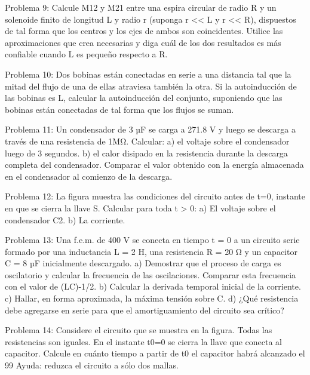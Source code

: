 Problema 9:
Calcule M12 y M21 entre una espira circular de radio R y un solenoide finito de longitud L y radio r (suponga r << L y r << R), dispuestos de tal forma que los centros y los ejes de ambos son coincidentes. Utilice las aproximaciones que crea necesarias y diga cuál de los dos resultados es más confiable cuando L es pequeño respecto a R.

Problema 10:
Dos bobinas están conectadas en serie a una distancia tal que la mitad del flujo de una de ellas atraviesa también la otra. Si la autoinducción de las bobinas es L, calcular la autoinducción del conjunto, suponiendo que las bobinas están conectadas de tal forma que los flujos se suman.



Problema 11:
Un condensador de 3 µF se carga a 271.8 V y luego se descarga a través de una resistencia de 1MΩ. Calcular:
a)	el voltaje sobre el condensador luego de 3 segundos.
b)	el calor disipado en la resistencia durante la descarga completa del condensador. Comparar el valor obtenido con la energía almacenada en el condensador al comienzo de la descarga.



Problema 12:
La figura muestra las condiciones del circuito antes de t=0, instante en que se cierra la llave S. Calcular para toda t > 0:
a)	El voltaje sobre el condensador C2.
b)	La corriente.



Problema 13:
Una f.e.m. de 400 V se conecta en tiempo t = 0 a un circuito serie formado por una inductancia
L = 2 H, una resistencia R = 20 Ω y un capacitor C = 8 µF inicialmente descargado.
a)	Demostrar que el proceso de carga es oscilatorio y calcular la frecuencia de las oscilaciones.
Comparar esta frecuencia con el valor de (LC)-1/2.
b)	Calcular la derivada temporal inicial de la corriente.
c)	Hallar, en forma aproximada, la máxima tensión sobre C.
d)	¿Qué resistencia debe agregarse en serie para que el amortiguamiento del circuito sea crítico?
 


 
Problema 14:
Considere el circuito que se muestra en la figura. Todas las resistencias son iguales. En el instante t0=0 se cierra la llave que conecta al capacitor. Calcule en cuánto tiempo a partir de t0 el capacitor habrá alcanzado el 99%
Ayuda: reduzca el circuito a sólo dos mallas.
 



